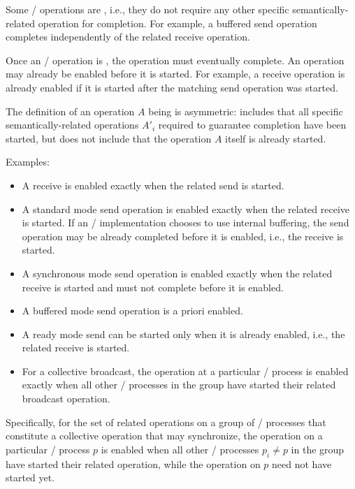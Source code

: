 Some \MPI/ operations are ,
i.e., they do not require any other specific semantically-related operation for completion.
For example, a buffered send operation completes independently of the related receive operation.

Once an \MPI/ operation is , the operation must eventually complete.
An operation may already be enabled before it is started.
For example, a receive operation is already enabled
if it is started after the matching send operation was started.

\begin{rationale}
The definition of an operation $A$ being  is asymmetric:
 includes that all specific semantically-related operations $A'_i$ required to guarantee completion have been started,
but does not include that the operation $A$ itself is already started.

Examples:
\begin{itemize}
\item A receive is enabled exactly when the related send is started.
\item A standard mode send operation is enabled exactly when the related receive is started.
If an \MPI/ implementation chooses to use internal buffering, the send operation may be already
completed
before it is enabled, i.e., the receive is started.
\item A synchronous mode send operation is enabled exactly when the related receive is started
and must not complete before it is enabled.
\item A buffered mode send operation is a priori enabled.
\item A ready mode send can be started only when it is already enabled, i.e., the related receive is started.
\item For a collective broadcast, the operation at a particular \MPI/ process is enabled exactly
      when all other \MPI/ processes in the group have started their related broadcast operation.
\end{itemize}

Specifically, for the set of related operations on a group of \MPI/ processes that constitute a collective operation that may synchronize,
the operation on a particular \MPI/ process $p$ is enabled when all other \MPI/ processes $p_i \neq p$ in the group
have started their related operation, while the operation on $p$ need not have started yet.
\end{rationale}

